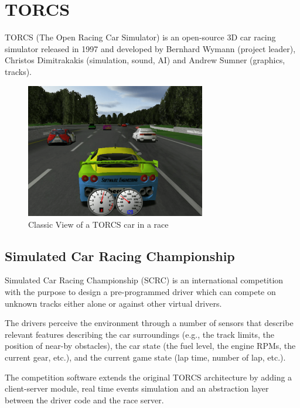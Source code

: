 \documentclass[Lau,oneside,noexaminfo]{sapthesis} %
\begin{document}
\chapter{TORCS}
TORCS (The Open Racing Car Simulator) is an open-source 3D car racing simulator released in 1997 and developed by Bernhard Wymann (project leader), Christos Dimitrakakis (simulation, sound, AI) and Andrew Sumner (graphics, tracks).
\begin{figure}[H]
\caption{Classic View of a TORCS car in a race}
\centering
\includegraphics[width=0.7\textwidth]{torcs}
\end{figure}
\section{Simulated Car Racing Championship}
\label{SCR}
Simulated Car Racing Championship (SCRC) is an international competition with the purpose to design a pre-programmed driver which can compete on unknown tracks either alone or against other virtual drivers.

The drivers perceive the environment through a number of sensors that describe relevant features describing the car surroundings (e.g., the track limits, the position of near-by obstacles), the car state (the fuel level, the engine RPMs, the current gear, etc.), and the current game state (lap time, number of lap, etc.).

The competition software extends the original TORCS architecture by adding a client-server module, real time events simulation and an abstraction layer between the driver code and the race server. \cite{SCR}
\end{document}
